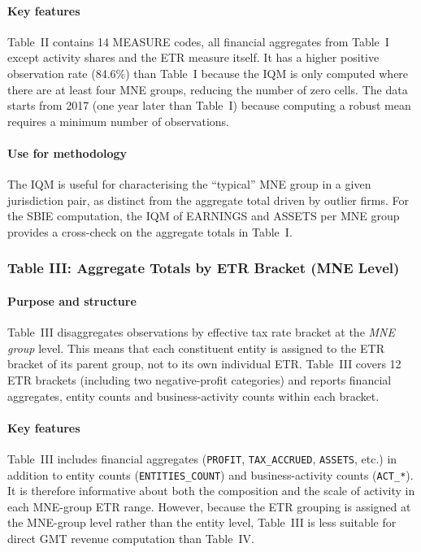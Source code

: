 \documentclass[11pt,a4paper]{article}
\newcommand{\code}[1]{\texttt{#1}}
\begin{document}
\paragraph{Key features}
Table~II contains 14 MEASURE codes, all financial aggregates from Table~I except activity shares and the ETR measure itself. It has a higher positive observation rate (84.6\%) than Table~I because the IQM is only computed where there are at least four MNE groups, reducing the number of zero cells. The data starts from 2017 (one year later than Table~I) because computing a robust mean requires a minimum number of observations.

\paragraph{Use for methodology}
The IQM is useful for characterising the ``typical'' MNE group in a given jurisdiction pair, as distinct from the aggregate total driven by outlier firms. For the SBIE computation, the IQM of EARNINGS and ASSETS per MNE group provides a cross-check on the aggregate totals in Table~I. 

\subsubsection{Table III: Aggregate Totals by ETR Bracket (MNE Level)}\label{sec:table3}

\paragraph{Purpose and structure}
Table~III disaggregates observations by effective tax rate bracket at the \emph{MNE group} level. This means that each constituent entity is assigned to the ETR bracket of its parent group, not to its own individual ETR. Table~III covers 12 ETR brackets (including two negative-profit categories) and reports financial aggregates, entity counts and business-activity counts within each bracket.

\paragraph{Key features}
Table~III includes financial aggregates (\code{PROFIT}, \code{TAX\_ACCRUED}, \code{ASSETS}, etc.) in addition to entity counts (\code{ENTITIES\_COUNT}) and business-activity counts (\code{ACT\_*}). It is therefore informative about both the composition and the scale of activity in each MNE-group ETR range. However, because the ETR grouping is assigned at the MNE-group level rather than the entity level, Table~III is less suitable for direct GMT revenue computation than Table~IV.
\end{document}
